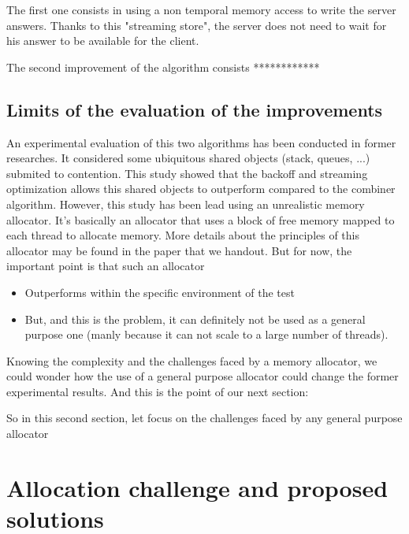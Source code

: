\documentclass[10pt]{article}											%
\begin{document}
The first one consists in using a non temporal memory access to write the server answers.   Thanks to this "streaming store", the server does not need to wait for his answer to be available for the client.

The second improvement of the algorithm consists ************





\subsection{Limits of the evaluation of the improvements}
An experimental evaluation of this two algorithms has been conducted in former researches.   It considered some ubiquitous shared objects (stack, queues, ...) submited to contention.   This study showed that the backoff and streaming optimization allows this shared objects to outperform compared to the combiner algorithm.   However, this study has been lead using an unrealistic memory allocator.   It's basically an allocator that uses a block of free memory mapped to each thread to allocate memory.   More details about the principles of this allocator may be found in the paper that we handout.   But for now, the important point is that such an allocator
	\begin{itemize}
		\item Outperforms within the specific environment of the test
        \item But, and this is the problem,  it can definitely not be used as a general purpose one (manly because it can not scale to a large number of threads).
	\end{itemize}
   Knowing the complexity and the challenges faced by a memory allocator, we could wonder how the use of a general purpose allocator could change the former experimental results. 
And this is the point of our next section: 

So in this second section, let focus on the challenges faced by any general purpose allocator







\newpage

\section{Allocation challenge and proposed solutions}
\end{document}
